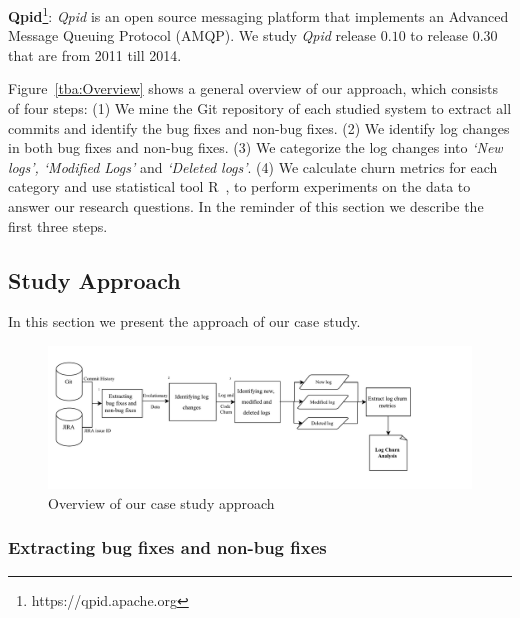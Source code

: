 {\textbf{Qpid}\footnote[3]{https://qpid.apache.org}}: \emph{Qpid} is an open source messaging platform that implements an Advanced Message Queuing Protocol (AMQP). We study \emph{Qpid} release $0.10$ to release $0.30$ that are from 2011 till 2014.


Figure~\ref{tba:Overview} shows a general overview of our approach, which consists of four steps: (1) We mine the Git repository of each studied system to extract all commits and identify the bug fixes and non-bug fixes. (2) We identify log changes in both bug fixes and non-bug fixes. (3) We categorize the log changes into \textsl{`New logs', `Modified Logs'} and \textsl{`Deleted logs'}. (4) We calculate churn metrics for each category and use statistical tool R~\cite{ihaka1996r}, to perform experiments on the data to answer our research questions.  In the reminder of this section we describe the first three steps.



\subsection{Study Approach}

In this section we present the approach of our case study. 
\begin{figure}[tb]
	\centering
	\includegraphics[scale=0.45]{MethdologyICESEM}
	\caption{ Overview of our case study approach }
	\label{fig:MethodologyICSME}
\end{figure}

\subsubsection{Extracting bug fixes and non-bug fixes}

